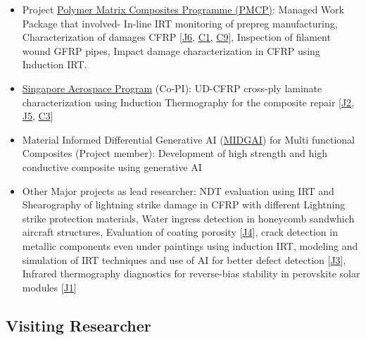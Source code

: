\documentclass{my_cv}%
\begin{document}
\begin{itemize}[leftmargin=0.15in]
\setlength\itemsep{-0.1em}
\color{mygray}
\item Project \href{https://www.a-star.edu.sg/imre/news-and-highlights/highlights/media/polymer-matrix-composites-programme-(pmcp)}{Polymer Matrix Composites Programme (PMCP)}: Managed Work Package that involved- In-line IRT monitoring of prepreg manufacturing, Characterization of damages CFRP [\textcolor{mypink}{\hyperref[J6]{J6}}, \textcolor{mypink}{\hyperref[C1]{C1}}, \textcolor{mypink}{\hyperref[C9]{C9}}], Inspection of filament wound GFRP pipes, Impact damage characterization in CFRP using Induction IRT.
\item \href{https://www.a-star.edu.sg/aerospace}{Singapore Aerospace Program} (Co-PI): UD-CFRP cross-ply laminate characterization using Induction Thermography for the composite repair [\textcolor{mypink}{\hyperref[J2]{J2}}, \textcolor{mypink}{\hyperref[J5]{J5}}, \textcolor{mypink}{\hyperref[C3]{C3}}]
\item Material Informed Differential Generative AI (\href{https://aisingapore.org/design-beyond-what-you-know-material-informed-differential-generative-ai-midgai-for-light-weight-high-entropy-alloys-and-multi-functional-composites/}{MIDGAI}) for Multi functional Composites (Project member): Development of high strength and high conductive composite using generative AI
\item Other Major projects as lead researcher: NDT evaluation using IRT and Shearography of lightning strike damage in CFRP with different Lightning strike protection materials, Water ingress detection in honeycomb sandwhich aircraft structures, Evaluation of coating porosity [\textcolor{mypink}{\hyperref[J4]{J4}}], crack detection in metallic components even under paintings using induction IRT, modeling and simulation of IRT techniques and use of AI for better defect detection [\textcolor{mypink}{\hyperref[J3]{J3}}], Infrared thermography diagnostics for reverse-bias stability in perovskite solar modules [\textcolor{mypink}{\hyperref[J1]{J1}}]
\end{itemize}%
{\color{mygray1} \hdashrule[0.1ex]{18.8cm}{0.2mm}{1mm}}
\subsection{Visiting Researcher}
\end{document}
